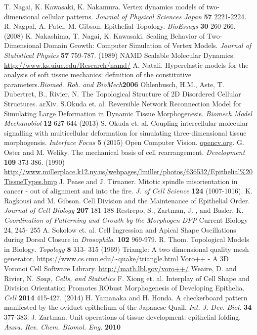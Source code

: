 \begin{thebibliography}{1}
 T. Nagai, K. Kawasaki, K. Nakamura. Vertex dynamics models of two-dimensional cellular patterns. \emph{Journal of Physical Sciences Japan} \textbf{57} 2221-2224.
 R. Nagpal, A. Patel, M. Gibson. Epithelial Topology. \emph{BioEssays} \textbf{30} 260-266. (2008)
 K. Nakashima, T. Nagai, K. Kawasaki. Scaling Behavior of Two-Dimensional  Domain Growth: Computer Simulation of Vertex Models. \emph{Journal of Statistical Physics} \textbf{57} 759-787. (1989)
 NAMD Scalable Molecular Dynamics. \url{http://www.ks.uiuc.edu/Research/namd/}
 A. Natali. Hyperelastic models for the analysis of soft tissue mechanics: definition of the constitutive parameters.\emph{Biomed. Rob. and BioMech}\textbf{2006}
 Ohlenbusch, H.M., Aste, T. Dubertret, B., Rivier, N. The Topological Structure of 2D Disordered Cellular Structures. arXiv.
 S.Okuda et. al. Reversible Network Reconnection Model for Simulating Large Deformation in Dynamic Tissue Morphogenesis. \emph{Biomech Model Mechanobiol} \textbf{12} 627-644 (2013)
 S. Okuda et. al. Coupling intercellular molecular signalling with multicellular deformation for simulating three-dimensional tissue morphogensis. \emph{Interface Focus} \textbf{5} (2015)
 Open Computer Vision. \url{opencv.org}.
G. Oster and M. Weliky. The mechanical basis of cell rearrangement. \emph{Development} \textbf{109} 373-386. (1990)
 \url{http://www.millerplace.k12.ny.us/webpages/lmiller/photos/636532/Epithelial\%20TissueTypes.bmp}
 J. Pease and J. Tirnauer. Mitotic spindle misorientation in cancer - out of alignment and into the fire. \emph{J. of Cell Science} \textbf{124} (1007-1016).
 K. Ragkousi and M. Gibson. Cell Division and the Maintenance of Epithelial Order. \emph{Journal of Cell Biology} \textbf{207} 181-188
 Restrepo, S., Zartman, J. , and Basler, K. \emph{ Coordination of Patterning and Growth by the Morphogen DPP} Current Biology 24, 245- 255
 A. Sokolow et. al. Cell Ingression and Apical Shape Oscillations during Dorsal Closure in \emph{Drosophila}. \textbf{102} 969-979.
 R. Thom. Topological Models in Biology. \emph{Topology} \textbf{8} 313- 315 (1969)
 Triangle: A two dimensional quality mesh generator. \url{https://www.cs.cmu.edu/~quake/triangle.html}
 Voro++ - A 3D Voronoi Cell Software Library. \url{http://math.lbl.gov/voro++/}
 Weaire, D. and Rivier, N. \emph{Soap, Cells, and Statistics}
 F. Xiong et. al. Interplay of Cell Shape and Division Orientation Promotes RObust Morphogenesis of Developing Epithelia. \emph{Cell} \textbf{2014} 415-427. (2014)
 H. Yamanaka and H. Honda. A checkerboard pattern manifested by the oviduct epithelium of the Japanese Quail. \emph{Int. J. Dev. Biol.} \textbf{34} 377-383.
 J. Zartman. Unit operations of tissue development: epithelial folding. \emph{Annu. Rev. Chem. Biomol. Eng. }\textbf{2010}
\end{thebibliography}


